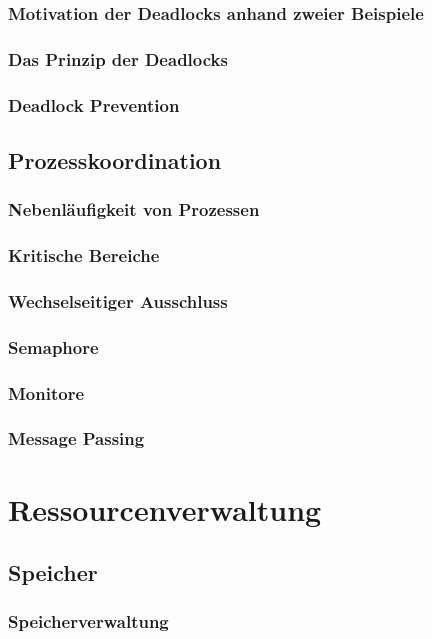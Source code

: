 \documentclass{article}
\begin{document}
\subsubsection{Motivation der Deadlocks anhand zweier Beispiele}
\subsubsection{Das Prinzip der Deadlocks}
\subsubsection{Deadlock Prevention}
\subsection{Prozesskoordination}
\subsubsection{Nebenläufigkeit von Prozessen}
\subsubsection{Kritische Bereiche}
\subsubsection{Wechselseitiger Ausschluss}
\subsubsection{Semaphore}
\subsubsection{Monitore}
\subsubsection{Message Passing}

\newpage
\section{Ressourcenverwaltung}
\subsection{Speicher}
\subsubsection{Speicherverwaltung}
\end{document}

